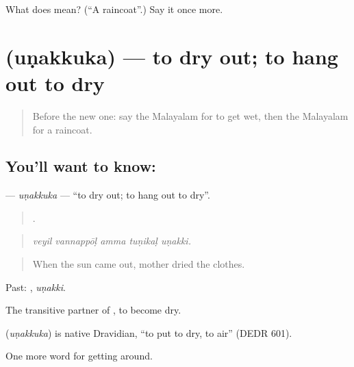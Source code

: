 \begin{tcolorbox}[breakable,colback=teal!4,colframe=teal!35!black,title={Before you move on}]
What does  mean? (\textquotedblleft{}A raincoat\textquotedblright{}.) Say it once more.
\end{tcolorbox}
\section[\texorpdfstring{\ml{ഉണക്കുക} (uṇakkuka)}{ഉണക്കുക (uṇakkuka)}]{ (uṇakkuka) — to dry out; to hang out to dry}

\label{lesson:ML-C508-unakkuka}



\begin{quote}
Before the new one: say the Malayalam for to get wet, then the Malayalam for a raincoat.
\end{quote}

\subsection*{You'll want to know: }
\textbf{} — \emph{uṇakkuka} — \textquotedblleft{}to dry out; to hang out to dry\textquotedblright{}.

\begin{quote}
    .
\end{quote}

\begin{quote}
\emph{veyil vannappōḷ amma tuṇikaḷ uṇakki.}
\end{quote}

\begin{quote}
When the sun came out, mother dried the clothes.
\end{quote}

Past: , \emph{uṇakki}.

The transitive partner of , to become dry.

\begin{cousinweb}
\textbf{} (\emph{uṇakkuka}) is native Dravidian, \textquotedblleft{}to put to dry, to air\textquotedblright{} (DEDR 601).
\end{cousinweb}

\begin{grammarlens}[title={What you've built}]
One more word for getting around.
\end{grammarlens}

